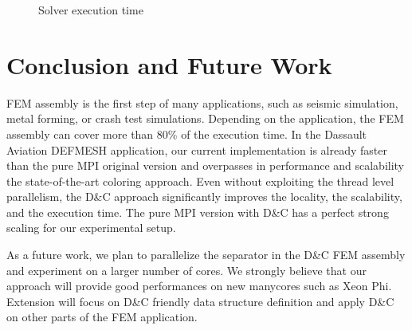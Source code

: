 \documentclass{IOS-Book-Article}
\begin{document}
\begin{figure}[htp]
 \centering
 \caption{Solver execution time}
 \label{fig:solCurves}
\end{figure}

\section{Conclusion and Future Work}
FEM assembly is the first step of many applications, such as seismic simulation, metal forming, or crash test simulations.
Depending on the application, the FEM assembly can cover more than 80\% of the execution time.
In the Dassault Aviation DEFMESH application, our current implementation is already faster than the pure MPI original version and overpasses in performance and scalability the state-of-the-art coloring approach. Even without exploiting the thread level parallelism, the D\&C approach  significantly improves the locality, the scalability, and the execution time.
The pure MPI version with D\&C has a perfect strong scaling for our experimental setup.

As a future work, we plan to parallelize the separator in the D\&C FEM assembly and experiment on a larger number of cores.
We strongly believe that our approach will provide good performances on new manycores such as Xeon Phi.
Extension will focus on D\&C friendly data structure definition and apply D\&C on other parts of the FEM application. 


\end{document}
